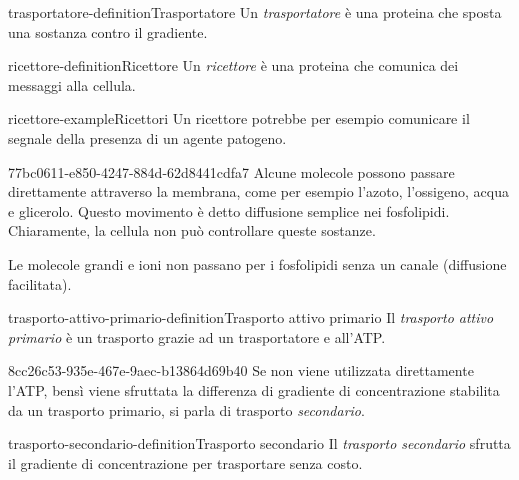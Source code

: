 \documentclass[preview]{standalone}
\begin{document}
\begin{snippetdefinition}{trasportatore-definition}{Trasportatore}
    Un \textit{trasportatore} è una proteina che sposta una sostanza contro il gradiente.
\end{snippetdefinition}


\begin{snippetdefinition}{ricettore-definition}{Ricettore}
    Un \textit{ricettore} è una proteina che comunica dei messaggi alla cellula.
\end{snippetdefinition}

\begin{snippetexample}{ricettore-example}{Ricettori}
    Un ricettore potrebbe per esempio comunicare il segnale della presenza di un agente patogeno.
\end{snippetexample}

\begin{snippet}{77bc0611-e850-4247-884d-62d8441cdfa7}
    Alcune molecole possono passare direttamente attraverso la membrana, come per esempio l'azoto, l'ossigeno, acqua e glicerolo.
    Questo movimento è detto diffusione semplice nei fosfolipidi. Chiaramente, la cellula non può controllare queste sostanze.

    Le molecole grandi e ioni non passano per i fosfolipidi senza un canale (diffusione facilitata).

\end{snippet}

\begin{snippetdefinition}{trasporto-attivo-primario-definition}{Trasporto attivo primario}
    Il \textit{trasporto attivo primario} è un trasporto grazie ad un trasportatore e all'ATP.
\end{snippetdefinition}

\begin{snippet}{8cc26c53-935e-467e-9aec-b13864d69b40}
    Se non viene utilizzata direttamente l'ATP,
    bensì viene sfruttata la differenza di gradiente di concentrazione stabilita da un trasporto primario,
    si parla di trasporto \textit{secondario}.
\end{snippet}

\begin{snippetdefinition}{trasporto-secondario-definition}{Trasporto secondario}
    Il \textit{trasporto secondario} sfrutta il gradiente di concentrazione per trasportare
    senza costo.
\end{snippetdefinition}
\end{document}
